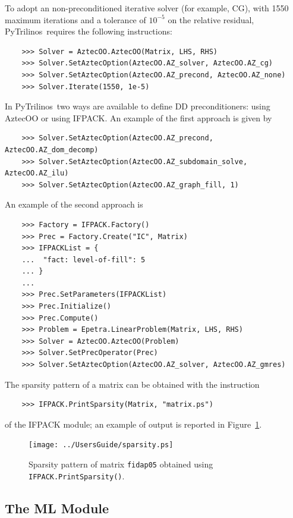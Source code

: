 \documentclass[10pt,relax]{SANDreport}
\newcommand{\PyTrilinos}{{PyTrilinos}}
\begin{document}
To adopt an non-preconditioned iterative solver (for example, CG),
with 1550 maximum iterations and a tolerance of $10^{-5}$ on the
relative residual, \PyTrilinos\ requires the following instructions:
\begin{verbatim}
    >>> Solver = AztecOO.AztecOO(Matrix, LHS, RHS)
    >>> Solver.SetAztecOption(AztecOO.AZ_solver, AztecOO.AZ_cg)
    >>> Solver.SetAztecOption(AztecOO.AZ_precond, AztecOO.AZ_none)
    >>> Solver.Iterate(1550, 1e-5)
\end{verbatim}

In \PyTrilinos\ two ways are available to define DD preconditioners:
using AztecOO or using IFPACK. An example of the first approach is
given by
\begin{verbatim}
    >>> Solver.SetAztecOption(AztecOO.AZ_precond, AztecOO.AZ_dom_decomp)
    >>> Solver.SetAztecOption(AztecOO.AZ_subdomain_solve, AztecOO.AZ_ilu)
    >>> Solver.SetAztecOption(AztecOO.AZ_graph_fill, 1)
\end{verbatim}
An example of the second approach is
\begin{verbatim}
    >>> Factory = IFPACK.Factory()
    >>> Prec = Factory.Create("IC", Matrix)
    >>> IFPACKList = {
    ...  "fact: level-of-fill": 5
    ... }
    ... 
    >>> Prec.SetParameters(IFPACKList)
    >>> Prec.Initialize()
    >>> Prec.Compute()
    >>> Problem = Epetra.LinearProblem(Matrix, LHS, RHS)
    >>> Solver = AztecOO.AztecOO(Problem)
    >>> Solver.SetPrecOperator(Prec)
    >>> Solver.SetAztecOption(AztecOO.AZ_solver, AztecOO.AZ_gmres)
\end{verbatim}
The sparsity pattern of a matrix can
be obtained with the instruction 
\begin{verbatim}
    >>> IFPACK.PrintSparsity(Matrix, "matrix.ps")
\end{verbatim}
of the IFPACK module; an example of output is reported in
Figure~\ref{fig:sparsity}.

\begin{figure}
\begin{center}
\texttt{[image: ../UsersGuide/sparsity.ps]}
\caption{Sparsity pattern of matrix {\tt fidap05} obtained using {\tt
  IFPACK.PrintSparsity()}.}
\label{fig:sparsity}
\end{center}
\end{figure}

\subsection{The ML Module}
\label{subsec:ml}
\end{document}
